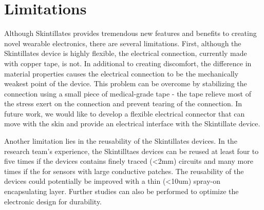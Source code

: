 \documentclass{sigchi}
\newcommand{\ignore}[1]{}
\begin{document}
\ignore{Why did you take it home? How long did you keep it on. Who did you show it to. Did you have any public experience. How did you fit this into your daily life? 
Every place: 
Upper arm 
During the course of wearing this, what else would you use it for. Sensing? 
Would you wear this again. Would you wear this on a different location?  

Skintillates was also invited to participate in the two-day exhibition of the National Maker Faire 2015. During which Skintillates LED displays powered by coin cell batteries were given out as part of the exhibit. The LED displays were customized to be a LED lit-up Maker Faire logo, as requested by the event organizer. Users mostly chose to wear the devices on the top of their arms and the outside of their lower legs. The devices were met with great enthusiasm and generated many inspiring conversations. In particular, the displays worn by the event organizer led many Maker Faire participants and potential academic collaborators to visit our booth and offer application suggestions such as displays for events like Burning Man, medical electrodes for children, or custom motion controller for robots.} 


\section {Limitations}
Although Skintillates provides tremendous new features and benefits to creating novel wearable electronics, there are several limitations. First, although the Skintillates device is highly flexible, the electrical connection, currently made with copper tape, is not. In additional to creating discomfort, the difference in material  properties causes the electrical connection to be the mechanically weakest point of the device. This problem can be overcome by stabilizing the connection using a small piece of medical-grade tape - the tape relieve most of the stress exert on the connection and prevent tearing of the connection. In future work, we would like to develop a flexible electrical connector that can move with the skin and provide an electrical interface with the Skintillate device. 

Another limitation lies in the reusability of the Skintillates devices. In the research team's experience, the Skintilltaes devices can be reused at least four to five times if the devices contains finely traced (<2mm) circuits and many more times if the for sensors with large conductive patches. The reusability of the devices could potentially be improved with a thin (<10um) spray-on encapsulating layer. Further studies can also be performed to optimize the electronic design for durability. 
\end{document}
